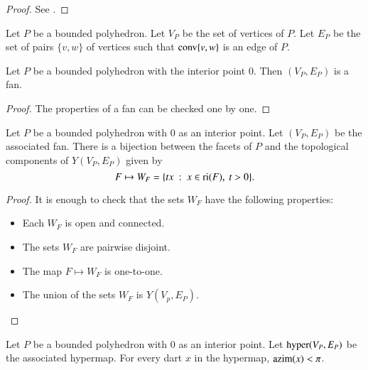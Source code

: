 \begin{proof} See \cite{webster:1994}.
\end{proof}

\begin{definition} Let $P$ be a bounded polyhedron.
Let $V_P$ be the set of vertices of $P$.  Let $E_P$ be the set of pairs $\{v,w\}$ of vertices such that ${\operatorname{conv}}\{v,w\}$ is an edge of $P$.
\end{definition}

\begin{lemma}\label{lemma:polyhedron}%
Let $P$ be a bounded polyhedron with the interior point $0$.
Then $(V_P,E_P)$ is a fan.
\end{lemma}

\begin{proof} The properties of a fan can be checked one by one.
\end{proof}

\begin{lemma} Let $P$ be a bounded polyhedron with $0$ as an interior point.  Let $(V_P,E_P)$ be the associated fan.  There is a bijection between the facets of $P$ and the topological components of $Y(V_P,E_P)$ given by 
$$
F \mapsto W_F = \{t x \ :\  x\in {\operatorname{ri}}(F),~t >0\}.
$$
\end{lemma}

\begin{proof} It is enough to check that the sets $W_F$ have the following properties:
\begin{itemize}
\item Each $W_F$ is open and connected.
\item The sets $W_F$ are pairwise disjoint.
\item The map $F\mapsto W_F$ is one-to-one.
\item The union of the sets $W_F$ is $Y(V_p,E_P)$.
\end{itemize}
\end{proof}


\begin{lemma} Let $P$ be a bounded polyhedron with $0$ as an interior point.  Let ${\operatorname{hyper}}(V_P,E_P)$ be the associated hypermap.  For every dart $x$ in the hypermap, ${\operatorname{azim}}(x) < \pi$.
\end{lemma}

